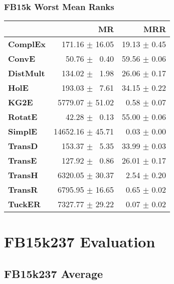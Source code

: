 \documentclass{article}
\begin{document}
\subsubsection{FB15k Worst Mean Ranks}
    \begin{center}
    \begin{tabular}{lrr}
\toprule
{} &                MR &           MRR \\
\midrule
\textbf{ComplEx } &  $\phantom{5}$$\phantom{5}$171.16 $\pm$ 16.05 &  19.13 $\pm$ 0.45 \\
\textbf{ConvE   } &  $\phantom{5}$$\phantom{5}$$\phantom{5}$50.76 $\pm$ $\phantom{5}$0.40 &  59.56 $\pm$ 0.06 \\
\textbf{DistMult} &  $\phantom{5}$$\phantom{5}$134.02 $\pm$ $\phantom{5}$1.98 &  26.06 $\pm$ 0.17 \\
\textbf{HolE    } &  $\phantom{5}$$\phantom{5}$193.03 $\pm$ $\phantom{5}$7.61 &  34.15 $\pm$ 0.22 \\
\textbf{KG2E    } &  $\phantom{5}$5779.07 $\pm$ 51.02 &  $\phantom{5}$0.58 $\pm$ 0.07 \\
\textbf{RotatE  } &  $\phantom{5}$$\phantom{5}$$\phantom{5}$42.28 $\pm$ $\phantom{5}$0.13 &  55.00 $\pm$ 0.06 \\
\textbf{SimplE  } &  14652.16 $\pm$ 45.71 &  $\phantom{5}$0.03 $\pm$ 0.00 \\
\textbf{TransD  } &  $\phantom{5}$$\phantom{5}$153.37 $\pm$ $\phantom{5}$5.35 &  33.99 $\pm$ 0.03 \\
\textbf{TransE  } &  $\phantom{5}$$\phantom{5}$127.92 $\pm$ $\phantom{5}$0.86 &  26.01 $\pm$ 0.17 \\
\textbf{TransH  } &  $\phantom{5}$6320.05 $\pm$ 30.37 &  $\phantom{5}$2.54 $\pm$ 0.20 \\
\textbf{TransR  } &  $\phantom{5}$6795.95 $\pm$ 16.65 &  $\phantom{5}$0.65 $\pm$ 0.02 \\
\textbf{TuckER  } &  $\phantom{5}$7327.77 $\pm$ 29.22 &  $\phantom{5}$0.07 $\pm$ 0.02 \\
\bottomrule
\end{tabular}

    \end{center}

\section{FB15k237 Evaluation}
\subsection{FB15k237 Average}
\end{document}
